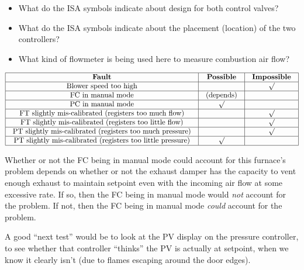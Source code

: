 \begin{itemize}
\item{} What do the ISA symbols indicate about design for both control valves?
\item{} What do the ISA symbols indicate about the placement (location) of the two controllers?
\item{} What kind of flowmeter is being used here to measure combustion air flow?
\end{itemize}








$$\vbox{\offinterlineskip
\halign{\strut
\vrule \quad\hfil # \ \hfil & 
\vrule \quad\hfil # \ \hfil & 
\vrule \quad\hfil # \ \hfil \vrule \cr
\noalign{\hrule}
%
{\bf Fault} & {\bf Possible} & {\bf Impossible} \cr
%
\noalign{\hrule}
%
Blower speed too high &  & $\surd$ \cr
%
\noalign{\hrule}
%
FC in manual mode & (depends) &  \cr
%
\noalign{\hrule}
%
PC in manual mode & $\surd$ &  \cr
%
\noalign{\hrule}
%
FT slightly mis-calibrated (registers too much flow) &  & $\surd$ \cr
%
\noalign{\hrule}
%
FT slightly mis-calibrated (registers too little flow) &  & $\surd$ \cr
%
\noalign{\hrule}
%
PT slightly mis-calibrated (registers too much pressure) &  & $\surd$ \cr
%
\noalign{\hrule}
%
PT slightly mis-calibrated (registers too little pressure) & $\surd$ &  \cr
%
\noalign{\hrule}
} %
}$$ %

Whether or not the FC being in manual mode could account for this furnace's problem depends on whether or not the exhaust damper has the capacity to vent enough exhaust to maintain setpoint even with the incoming air flow at some excessive rate.  If so, then the FC being in manual mode would {\it not} account for the problem.  If not, then the FC being in manual mode {\it could} account for the problem.







A good ``next test'' would be to look at the PV display on the pressure controller, to see whether that controller ``thinks'' the PV is actually at setpoint, when we know it clearly isn't (due to flames escaping around the door edges).




